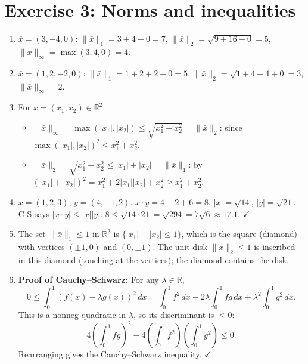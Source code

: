 \documentclass[12pt,a4paper]{article}
\begin{document}
\section*{Exercise 3: Norms and inequalities}

\begin{enumerate}[leftmargin=*, label=(\alph*)]

\item $\bar{x}=(3,-4,0)$: $\|\bar{x}\|_1=3+4+0=7$, $\|\bar{x}\|_2=\sqrt{9+16+0}=5$, $\|\bar{x}\|_\infty=\max(3,4,0)=4$.

\item $\bar{x}=(1,2,-2,0)$: $\|\bar{x}\|_1=1+2+2+0=5$, $\|\bar{x}\|_2=\sqrt{1+4+4+0}=3$, $\|\bar{x}\|_\infty=2$.

\item For $\bar{x}=(x_1,x_2)\in\mathbb{R}^2$:
\begin{itemize}
\item $\|\bar{x}\|_\infty=\max(|x_1|,|x_2|)\le\sqrt{x_1^2+x_2^2}=\|\bar{x}\|_2$: since $\max(|x_1|,|x_2|)^2\le x_1^2+x_2^2$.
\item $\|\bar{x}\|_2=\sqrt{x_1^2+x_2^2}\le|x_1|+|x_2|=\|\bar{x}\|_1$: by $(|x_1|+|x_2|)^2=x_1^2+2|x_1||x_2|+x_2^2\ge x_1^2+x_2^2$.
\end{itemize}

\item $\bar{x}=(1,2,3)$, $\bar{y}=(4,-1,2)$.
$\bar{x}\cdot\bar{y}=4-2+6=8$.
$|\bar{x}|=\sqrt{14}$, $|\bar{y}|=\sqrt{21}$.
C-S says $|\bar{x}\cdot\bar{y}|\le|\bar{x}||\bar{y}|$: $8\le\sqrt{14\cdot 21}=\sqrt{294}=7\sqrt{6}\approx 17.1$. $\checkmark$

\item The set $\|\bar{x}\|_1\le 1$ in $\mathbb{R}^2$ is $\{|x_1|+|x_2|\le 1\}$, which is the square (diamond) with vertices $(\pm 1,0)$ and $(0,\pm 1)$. The unit disk $\|\bar{x}\|_2\le 1$ is inscribed in this diamond (touching at the vertices); the diamond contains the disk.

\item \textbf{Proof of Cauchy--Schwarz:} For any $\lambda\in\mathbb{R}$,
\[0\le\int_0^1(f(x)-\lambda g(x))^2\,dx=\int_0^1 f^2\,dx-2\lambda\int_0^1 fg\,dx+\lambda^2\int_0^1 g^2\,dx.\]
This is a nonneg quadratic in $\lambda$, so its discriminant is $\le 0$:
\[4\left(\int_0^1 fg\right)^2-4\left(\int_0^1 f^2\right)\left(\int_0^1 g^2\right)\le 0.\]
Rearranging gives the Cauchy--Schwarz inequality. $\checkmark$

\end{enumerate}
\end{document}
